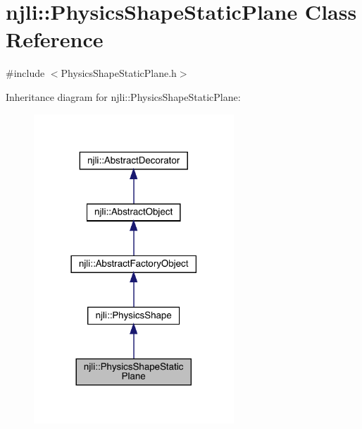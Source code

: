 \hypertarget{classnjli_1_1_physics_shape_static_plane}{}\section{njli\+:\+:Physics\+Shape\+Static\+Plane Class Reference}
\label{classnjli_1_1_physics_shape_static_plane}


{\ttfamily \#include $<$Physics\+Shape\+Static\+Plane.\+h$>$}



Inheritance diagram for njli\+:\+:Physics\+Shape\+Static\+Plane\+:\nopagebreak
\begin{figure}[H]
\begin{center}
\leavevmode
\includegraphics[width=213pt]{classnjli_1_1_physics_shape_static_plane__inherit__graph}
\end{center}
\end{figure}


